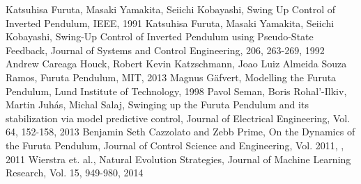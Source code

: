 

\begin{thebibliography}{}
%
%
Katsuhisa Furuta, Masaki Yamakita, Seiichi Kobayashi, Swing Up Control of Inverted Pendulum, IEEE, 1991
Katsuhisa Furuta, Masaki Yamakita, Seiichi Kobayashi, Swing-Up Control of Inverted Pendulum using Pseudo-State Feedback, Journal of Systems and Control Engineering, 206, 263-269, 1992
Andrew Careaga Houck, Robert Kevin Katzschmann, Joao Luiz Almeida Souza Ramos, Furuta Pendulum, MIT, 2013
Magnus Gäfvert, Modelling the Furuta Pendulum, Lund Institute of Technology, 1998
Pavol Seman, Boris Rohal'-Ilkiv, Martin Juhás, Michal Salaj, Swinging up the Furuta Pendulum and its stabilization via model predictive control, Journal of Electrical Engineering, Vol. 64, 152-158, 2013
Benjamin Seth Cazzolato and Zebb Prime, On the Dynamics of the Furuta Pendulum, Journal of Control Science and Engineering, Vol. 2011, , 2011
Wierstra et. al., Natural Evolution Strategies, Journal of Machine Learning Research, Vol. 15, 949-980, 2014


\end{thebibliography}


